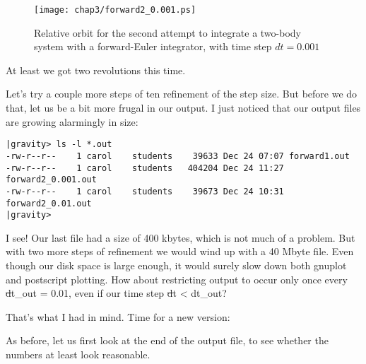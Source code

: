 \begin{figure}[ht]
\centering
\texttt{[image: chap3/forward2\_0.001.ps]}
\caption[Two-body orbit with a forward-Euler integrator, time step
$dt = 0.001$]
{Relative orbit for the second attempt to integrate a two-body system with a
forward-Euler integrator, with time step $dt = 0.001$}
\label{fig:forward2-0.001}
\end{figure}

\abc

\alice
At least we got two revolutions this time.

\carol
Let's try a couple more steps of ten refinement of the step size.
But before we do that, let us be a bit more frugal in our output.
I just noticed that our output files are growing alarmingly in size:

\cba

\begin{small}
\begin{verbatim}
|gravity> ls -l *.out
-rw-r--r--    1 carol    students    39633 Dec 24 07:07 forward1.out
-rw-r--r--    1 carol    students   404204 Dec 24 11:27 forward2_0.001.out
-rw-r--r--    1 carol    students    39673 Dec 24 10:31 forward2_0.01.out
|gravity> 
\end{verbatim}
\end{small}

\abc

\bob
I see!  Our last file had a size of 400 kbytes, which is not much of a
problem.  But with two more steps of refinement we would wind up with
a 40 Mbyte file.  Even though our disk space is large enough, it would
surely slow down both gnuplot and postscript plotting.  How about
restricting output to occur only once every {\st dt\_out = 0.01}, even
if our time step {\st dt < dt\_out}?

\carol
That's what I had in mind.  Time for a new version:

\cba


\abc

\carol
As before, let us first look at the end of the output file, to see
whether the numbers at least look reasonable.

\cba


